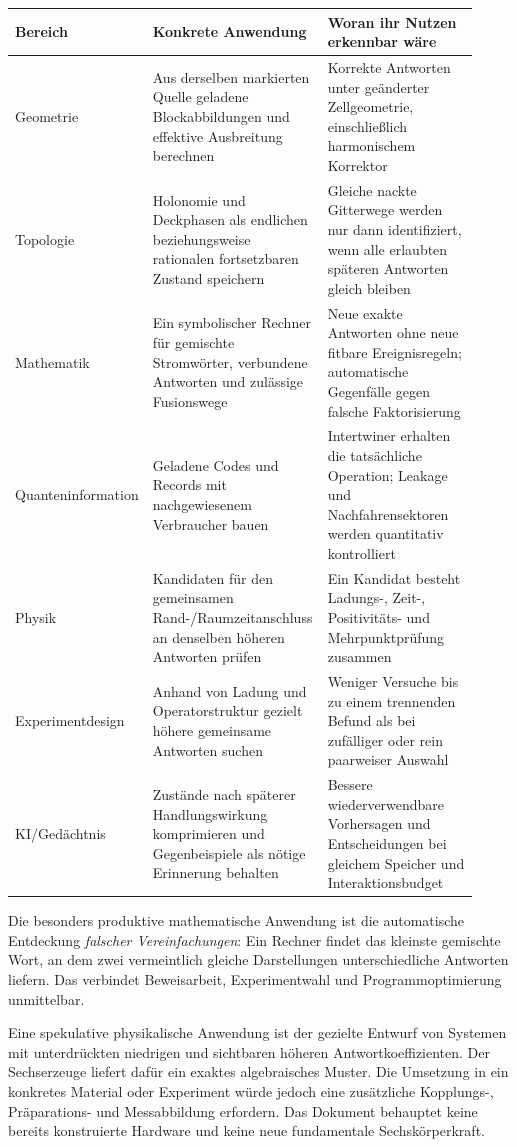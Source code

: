 \begin{longtable}{L{0.18\linewidth}L{0.38\linewidth}L{0.36\linewidth}}
\toprule
Bereich & Konkrete Anwendung & Woran ihr Nutzen erkennbar wäre\\\midrule\endhead
Geometrie & Aus derselben markierten Quelle geladene Blockabbildungen und effektive Ausbreitung berechnen & Korrekte Antworten unter geänderter Zellgeometrie, einschließlich harmonischem Korrektor\\
Topologie & Holonomie und Deckphasen als endlichen beziehungsweise rationalen fortsetzbaren Zustand speichern & Gleiche nackte Gitterwege werden nur dann identifiziert, wenn alle erlaubten späteren Antworten gleich bleiben\\
Mathematik & Ein symbolischer Rechner für gemischte Stromwörter, verbundene Antworten und zulässige Fusionswege & Neue exakte Antworten ohne neue fitbare Ereignisregeln; automatische Gegenfälle gegen falsche Faktorisierung\\
Quanten\-information & Geladene Codes und Records mit nachgewiesenem Verbraucher bauen & Intertwiner erhalten die tatsächliche Operation; Leakage und Nachfahrensektoren werden quantitativ kontrolliert\\
Physik & Kandidaten für den gemeinsamen Rand-/Raumzeitanschluss an denselben höheren Antworten prüfen & Ein Kandidat besteht Ladungs-, Zeit-, Positivitäts- und Mehrpunktprüfung zusammen\\
Experiment\-design & Anhand von Ladung und Operatorstruktur gezielt höhere gemeinsame Antworten suchen & Weniger Versuche bis zu einem trennenden Befund als bei zufälliger oder rein paarweiser Auswahl\\
KI/Gedächtnis & Zustände nach späterer Handlungswirkung komprimieren und Gegenbeispiele als nötige Erinnerung behalten & Bessere wiederverwendbare Vorhersagen und Entscheidungen bei gleichem Speicher und Interaktionsbudget\\\bottomrule
\end{longtable}

Die besonders produktive mathematische Anwendung ist die automatische Entdeckung \emph{falscher Vereinfachungen}: Ein Rechner findet das kleinste gemischte Wort, an dem zwei vermeintlich gleiche Darstellungen unterschiedliche Antworten liefern. Das verbindet Beweisarbeit, Experimentwahl und Programmoptimierung unmittelbar.

Eine spekulative physikalische Anwendung ist der gezielte Entwurf von Systemen mit unterdrückten niedrigen und sichtbaren höheren Antwortkoeffizienten. Der Sechserzeuge liefert dafür ein exaktes algebraisches Muster. Die Umsetzung in ein konkretes Material oder Experiment würde jedoch eine zusätzliche Kopplungs-, Präparations- und Messabbildung erfordern. Das Dokument behauptet keine bereits konstruierte Hardware und keine neue fundamentale Sechskörperkraft.

